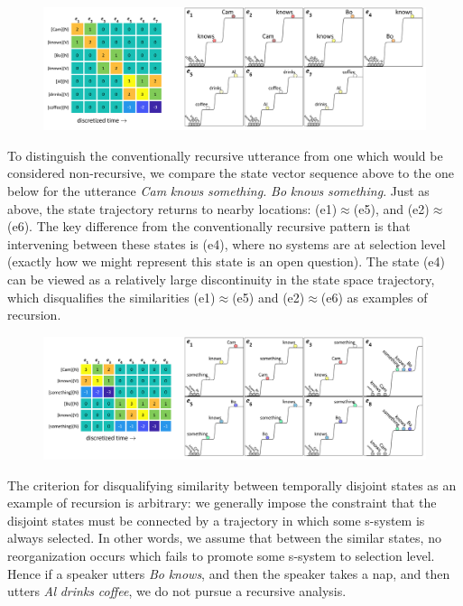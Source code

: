   
\begin{figure}
\includegraphics[width=\textwidth]{figures/Tilsen-img112.png}
\caption{\missingcaption}
\label{fig:}
\end{figure}
 

  To distinguish the conventionally recursive utterance from one which would be considered non-recursive, we compare the state vector sequence above to the one below for the utterance \textit{Cam} \textit{knows} \textit{something.} \textit{Bo} \textit{knows} \textit{something}. Just as above, the state trajectory returns to nearby locations: (e1)${\approx}$(e5), and (e2)${\approx}$(e6). The key difference from the conventionally recursive pattern is that intervening between these states is (e4), where no systems are at selection level (exactly how we might represent this state is an open question). The state (e4) can be viewed as a relatively large discontinuity in the state space trajectory, which disqualifies the similarities (e1)${\approx}$(e5) and (e2)${\approx}$(e6) as examples of recursion.

  
\begin{figure}
\includegraphics[width=\textwidth]{figures/Tilsen-img113.png}
\caption{\missingcaption}
\label{fig:}
\end{figure}
 

  The criterion for disqualifying similarity between temporally disjoint states as an example of recursion is arbitrary: we generally impose the constraint that the disjoint states must be connected by a trajectory in which some s-system is always selected. In other words, we assume that between the similar states, no reorganization occurs which fails to promote some s-system to selection level. Hence if a speaker utters \textit{Bo} \textit{knows}, and then the speaker takes a nap, and then utters \textit{Al} \textit{drinks} \textit{coffee}, we do not pursue a recursive analysis. 

